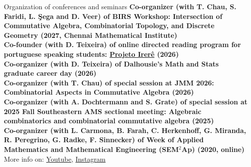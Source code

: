 \documentclass[12pt]{resume} %
\begin{document}
\begin{rSection}{Organization of conferences and seminars}
{\bf Co-organizer (with T. Chau, S. Faridi, L. \c{S}ega and D. Veer) of BIRS Workshop: Intersection of Commutative Algebra, Combinatorial Topology, and Discrete Geometry (2027, Chennai Mathematical Institute)}
\\[1mm]
{\bf Co-founder (with D. Teixeira) of online directed reading program for portuguese speaking students: \href{https://irere.org}{Projeto Irerê} (2026)} 
\\[1mm]
{\bf Co-organizer (with D. Teixeira) of Dalhousie's Math and Stats graduate career day (2026)}
\\[1mm]
{\bf Co-organizer (with T. Chau) of special session at JMM 2026: Combinatorial Aspects in Commutative Algebra (2026)}
\\[1mm]
{\bf Co-organizer (with A. Dochtermann and S. Grate) of special session at 2025 Fall Southeastern AMS sectional meeting: Algebraic combinatorics and combinatorial commutative algebra (2025)}
\\[1mm]
{\bf Co-organizer (with L. Carmona, B. Farah, C. Herkenhoff, G. Miranda, R. Peregrino, G. Radke, F. Sinnecker) of Week of Applied Mathematics and Mathematical Engineering (SEM$^2$Ap) (2020, online)}
{\scriptsize More info on: \href{https://www.youtube.com/channel/UC14NMQ5cOsSuLrAQGGa2T4Q}{Youtube}, 
\href{https://www.instagram.com/semap.rio/}{Instagram}}
\\[1mm]
\end{rSection}





\end{document}
